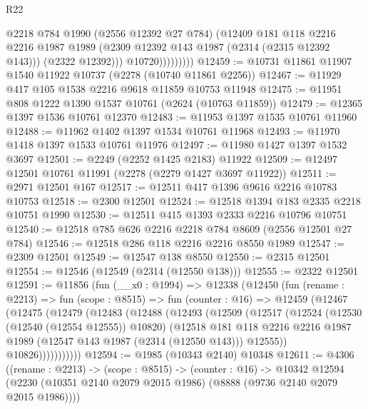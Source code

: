 \begin{lexlean}{R22}
\begin{coremodule}
                        @2218
                        @784
                        @1990
                        (@2556 @12392 @27 @784)
                        (@12409
                          @181
                          @118
                          @2216
                          @2216
                          @1987
                          @1989
                          (@2309 @12392 @143 @1987 (@2314 (@2315 @12392 @143)))
                          (@2322 @12392)))
                      @10720)))))))))
@12459 := @10731 @11861 @11907 @1540 @11922 @10737 (@2278 (@10740 @11861 @2256))
@12467 := @11929 @417 @105 @1538 @2216 @9618 @11859 @10753 @11948
@12475 := @11951 @808 @1222 @1390 @1537 @10761 (@2624 (@10763 @11859))
@12479 := @12365 @1397 @1536 @10761 @12370
@12483 := @11953 @1397 @1535 @10761 @11960
@12488 := @11962 @1402 @1397 @1534 @10761 @11968
@12493 := @11970 @1418 @1397 @1533 @10761 @11976
@12497 := @11980 @1427 @1397 @1532 @3697
@12501 := @2249 (@2252 @1425 @2183) @11922
@12509 := @12497 @12501 @10761 @11991 (@2278 (@2279 @1427 @3697 @11922))
@12511 := @2971 @12501 @167
@12517 := @12511 @417 @1396 @9616 @2216 @10783 @10753
@12518 := @2300 @12501
@12524 := @12518 @1394 @183 @2335 @2218 @10751 @1990
@12530 := @12511 @415 @1393 @2333 @2216 @10796 @10751
@12540 := @12518 @785 @626 @2216 @2218 @784 @8609 (@2556 @12501 @27 @784)
@12546 := @12518 @286 @118 @2216 @2216 @8550 @1989
@12547 := @2309 @12501
@12549 := @12547 @138 @8550
@12550 := @2315 @12501
@12554 := @12546 (@12549 (@2314 (@12550 @138)))
@12555 := @2322 @12501
@12591 := @11856
    (fun (__x0 : @1994) =>
    @12338
      (@12450
        (fun (rename : @2213) =>
        fun (scope : @8515) =>
        fun (counter : @16) =>
        @12459
          (@12467
            (@12475
              (@12479
                (@12483
                  (@12488
                    (@12493
                      (@12509
                        (@12517
                          (@12524
                            (@12530 (@12540 (@12554 @12555)) @10820)
                            (@12518
                              @181
                              @118
                              @2216
                              @2216
                              @1987
                              @1989
                              (@12547 @143 @1987 (@2314 (@12550 @143)))
                              @12555))
                          @10826)))))))))))
@12594 := @1985 (@10343 @2140) @10348
@12611 := @4306
    ((rename : @2213) ->
    (scope : @8515) ->
    (counter : @16) ->
    @10342 @12594 (@2230 (@10351 @2140 @2079 @2015 @1986) (@8888 (@9736 @2140 @2079 @2015 @1986))))

\end{coremodule}
\end{lexlean}
